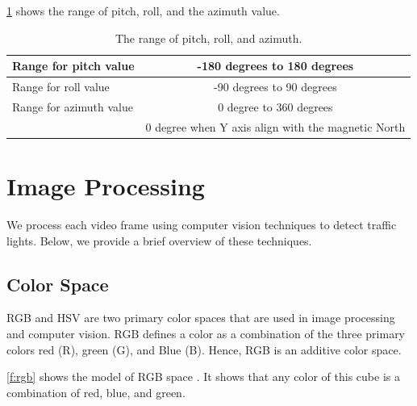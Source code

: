 \ref{t:rpy} shows the range of pitch, roll, and the azimuth value.
\begin{table}[h!]
  \centering
  \caption{The range of pitch, roll, and azimuth.}
  \label{t:rpy}
  \begin{tabular}{  l | c  }
    
    Range for pitch value & -180 degrees to 180 degrees \\
    \hline
    Range for roll value & -90 degrees to 90 degrees  \\
    \hline 
    Range for azimuth value & 0 degree to 360 degrees \\
    & 0 degree when Y axis align with the magnetic North \\
    
  \end{tabular}
\end{table}


\section {Image Processing}
We process each video frame using computer vision techniques to detect traffic lights. 
Below, we provide a brief overview of these techniques. 

\subsection{Color Space}
\label{s:color_space}
RGB \cite{rgb} and HSV \cite{hsv} are two primary color spaces that are used in image processing and computer vision.
RGB defines a color as a combination of the three primary colors red (R), green (G), and Blue (B).
Hence, RGB is an additive color space.

\ref{f:rgb} shows the model of RGB space \cite{rgb}.
It shows that any color of this cube is a combination of red, blue, and green.

